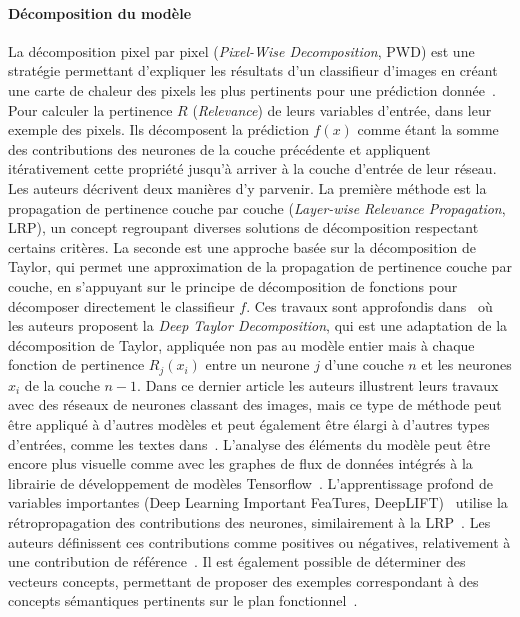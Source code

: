 \paragraph{Décomposition du modèle}
La décomposition pixel par pixel (\textit{Pixel-Wise Decomposition}, PWD) est une stratégie permettant d'expliquer les résultats d'un classifieur d'images en créant une carte de chaleur des pixels les plus pertinents pour une prédiction donnée~\cite{Bach2015}.
Pour calculer la pertinence $R$ (\textit{Relevance}) de leurs variables d'entrée, dans leur exemple des pixels. Ils décomposent la prédiction $f(x)$ comme étant la somme des contributions des neurones de la couche précédente et appliquent itérativement cette propriété jusqu'à arriver à la couche d'entrée de leur réseau. Les auteurs décrivent deux manières d'y parvenir.
La première méthode est la propagation de pertinence couche par couche (\textit{Layer-wise Relevance Propagation}, LRP), un concept regroupant diverses solutions de décomposition respectant certains critères. La seconde est une approche basée sur la décomposition de Taylor, qui permet une approximation de la propagation de pertinence couche par couche, en s'appuyant sur le principe de décomposition de fonctions pour décomposer directement le classifieur $f$.
Ces travaux sont approfondis dans~\cite{Montavon2017} où les auteurs proposent la \textit{Deep Taylor Decomposition}, qui est une adaptation de la décomposition de Taylor, appliquée non pas au modèle entier mais à chaque fonction de pertinence $R_j({x_i})$ entre un neurone $j$ d'une couche $n$ et les neurones ${x_i}$ de la couche $n-1$.
Dans ce dernier article les auteurs illustrent leurs travaux avec des réseaux de neurones classant des images, mais ce type de méthode peut être appliqué à d'autres modèles et peut également être élargi à d'autres types d'entrées, comme les textes dans~\cite{Montavon2017}.
L'analyse des éléments du modèle peut être encore plus visuelle comme avec les graphes de flux de données intégrés à la librairie de développement de modèles Tensorflow~\cite{Wongsuphasawat2017}.
L'apprentissage profond de variables importantes (Deep Learning Important FeaTures, DeepLIFT)~\cite{Shrikumar2017} utilise la rétropropagation des contributions des neurones, similairement à la LRP~\cite{Bach2015}. Les auteurs définissent ces contributions comme positives ou négatives, relativement à une contribution de référence~\cite{Shrikumar2017}.
Il est également possible de déterminer des vecteurs concepts, permettant de proposer des exemples correspondant à des concepts sémantiques pertinents sur le plan fonctionnel~\cite{Kim2018}.

